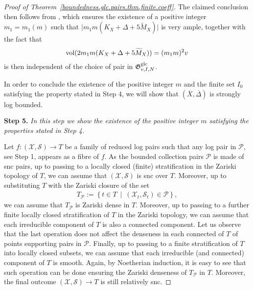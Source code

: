 \documentclass[12pt, a4paper]{amsart}
\newcommand{\setgpairsdcc}[1]{\mathfrak G^{\rm g#1}_{v, I, N}}
\newcounter{Theorem}
\theoremstyle{definition}
\theoremstyle{named}
\begin{document}
\begin{proof}[Proof of Theorem~\ref{boundedness.glc.pairs.thm.finite.coeff}]
The claimed conclusion then follows from 
\cite[Theorem~1.1]{fujino-2016},
which ensures the existence of a positive integer 
$m_1=m_1(m)$
such that 
$\vert m_1m(K_{X}+\Delta+5\widetilde{M}_X)\vert$
is very ample, together with the fact that 
\begin{align*}
{\rm vol}(2m_1m(K_{X}+\Delta+5\widetilde{M}_X))= 
(m_1m)^2v
\end{align*}
is then independent of the choice of pair in
$\setgpairsdcc{lc}$.

\medskip

In order to conclude the existence of the positive integer 
$m$ 
and the finite set 
$I_0$
satisfying the property stated in Step 4, we will show that 
$(\overline X, \overline \Delta)$
is strongly log bounded.

\medskip

{\bf Step 5. }{\it In this step we show the existence of the positive integer $m$ satisfying the properties stated in Step 4.}





Let  
$f \colon (\mathcal X, \mathcal S) \to T$
be a family of reduced log pairs such that any log pair in
$\mathcal P$, see Step 1, appears as a fibre of $f$.
As the bounded collection pairs $\mathcal P$ is made of snc pairs, up to passing to a locally closed (finite) stratification in the Zariski topology of $T$, 
we can assume that 
$(\mathcal X, \mathcal S)$
is snc over 
$T$.
Moreover, up to substituting 
$T$ with the Zariski closure of the set
\begin{align*}
T_{\mathcal P} :=
    \left \{
t \in T \ 
\middle \vert \
(\mathcal X_t, \mathcal S_t) \in \mathcal P
    \right \}, 
\end{align*}
we can assume that 
$T_{\mathcal P}$ 
is Zariski dense in 
$T$.
Moreover, up to passing to a further finite locally closed stratification of 
$T$ 
in the Zariski topology, we can assume that each irreducible component of 
$T$
is also a connected component.
Let us observe that the last operation does not affect the denseness in each connected of $T$ of points supporting pairs in $\mathcal P$.
Finally, up to passing to a finite stratification of $T$ into locally closed subsets, we can assume that each irreducible (and connected) component of 
$T$
is smooth.
Again, by Noetherian induction, it is easy to see that such operation can be done ensuring the Zariski denseness of 
$T_{\mathcal P}$ 
in 
$T$.
Moreover, the final outcome 
$(\mathcal X, \mathcal S) \to T$ 
is still relatively snc.


\end{proof}
\end{document}
